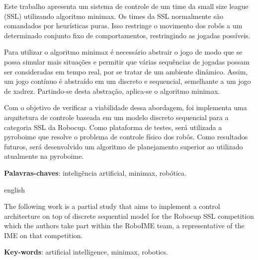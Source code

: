 \setlength{\absparsep}{18pt} %
\begin{resumo}


  Este trabalho apresenta um sistema de controle de um time da small size league
  (SSL) utilizando algoritmo minimax. Os times da SSL normalmente são comandados
  por heurísticas puras. Isso restringe o movimento dos robôs a um determinado
  conjunto fixo de comportamentos, restringindo as jogadas possíveis.

  Para utilizar o algoritmo minimax é necessário abstrair o jogo de modo que se
  possa simular mais situações e permitir que várias sequências de jogadas
  possam ser consideradas em tempo real, por se tratar de um ambiente dinâmico.
  Assim, um jogo contínuo é abstraído em um discreto e sequencial,
  semelhante a um jogo de xadrez. Partindo-se desta abstração, aplica-se o
  algoritmo minimax.

  Com o objetivo de verificar a viabilidade dessa abordagem, foi implementa uma
  arquitetura de controle baseada em um modelo discreto sequencial para a
  categoria SSL da Robocup. Como plataforma de testes, será utilizada a pyroboime
  que resolve o problema de controle físico dos robôs. Como resultados futuros,
  será desenvolvido um algoritmo de planejamento superior ao utilizado
  atualmente na pyroboime.

  \textbf{Palavras-chaves}: inteligência artificial, minimax, robótica.
\end{resumo}

\begin{resumo}[Abstract]
  \begin{otherlanguage*}{english}


    The following work is a partial study that aims to implement a control
    architecture on top of discrete sequential model for the Robocup SSL
    competition which the authors take part within the RoboIME team, a
    representative of the IME on that competition.

    \textbf{Key-words}: artificial intelligence, minimax, robotics.
  \end{otherlanguage*}
\end{resumo}


